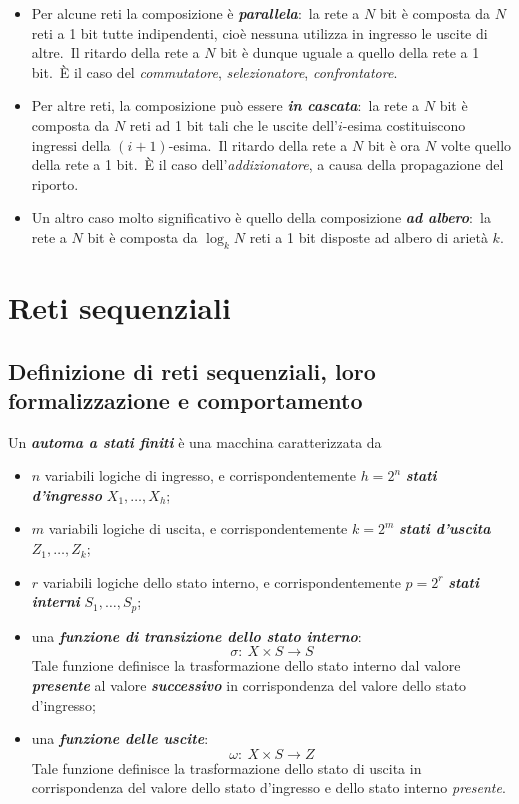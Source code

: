 \begin{itemize}
    \item Per alcune reti la composizione è \textbf{\textit{parallela}}:\ la rete a $N$ bit è composta da $N$ reti a 1 bit tutte indipendenti, cioè nessuna utilizza in ingresso le uscite di altre.\ Il ritardo della rete a $N$ bit è dunque uguale a quello della rete a 1 bit.\ È il caso del \textit{commutatore}, \textit{selezionatore}, \textit{confrontatore}.
    \item Per altre reti, la composizione può essere \textbf{\textit{in cascata}}:\ la rete a $N$ bit è composta da $N$ reti ad 1 bit tali che le uscite dell'$i$-esima costituiscono ingressi della $(i+1)$-esima.\ Il ritardo della rete a $N$ bit è ora $N$ volte quello della rete a 1 bit.\ È il caso dell'\textit{addizionatore}, a causa della propagazione del riporto.
    \item Un altro caso molto significativo è quello della composizione \textbf{\textit{ad albero}}:\ la rete a $N$ bit è composta da $\log_k N$ reti a 1 bit disposte ad albero di arietà $k$.
\end{itemize}

\section{Reti sequenziali}

\subsection{Definizione di reti sequenziali, loro formalizzazione e comportamento}

Un \textbf{\textit{automa a stati finiti}} è una macchina caratterizzata da
\begin{itemize}
    \item $n$ variabili logiche di ingresso, e corrispondentemente $h = 2^n$ \textbf{\textit{stati d'ingresso}} $X_1, \dots, X_h$;
    \item $m$ variabili logiche di uscita, e corrispondentemente $k = 2^m$ \textbf{\textit{stati d'uscita}} $Z_1, \dots, Z_k$;
    \item $r$ variabili logiche dello stato interno, e corrispondentemente $p = 2^r$ \textbf{\textit{stati interni}} $S_1, \dots, S_p$;
    \item una \textbf{\textit{funzione di transizione dello stato interno}}:
          \[\sigma:\ X \times S \rightarrow S\]
          Tale funzione definisce la trasformazione dello stato interno dal valore \textbf{\textit{presente}} al valore \textbf{\textit{successivo}} in corrispondenza del valore dello stato d'ingresso;
    \item una \textbf{\textit{funzione delle uscite}}:
          \[\omega:\ X \times S \rightarrow Z \]
          Tale funzione definisce la trasformazione dello stato di uscita in corrispondenza del valore dello stato d'ingresso e dello stato interno \textit{presente}.
\end{itemize}

